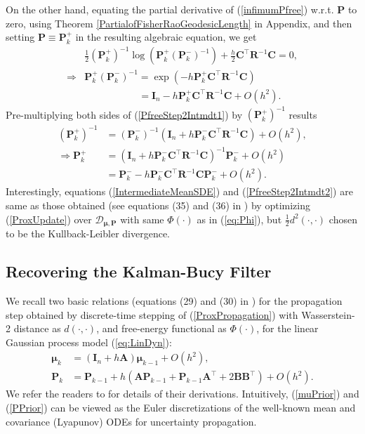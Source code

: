 \documentclass[letterpaper,10pt,twocolumn,conference]{ieeeconf}
\newcommand{\cD}{{\mathscr{D}}}
\newcommand{\bmu}{\bm{\mu}}
\newcommand{\bbP}{{\bm{P}}}
\newcommand{\bbR}{\bm{R}}
\newcommand{\bbA}{\bm{A}}
\newcommand{\bbB}{\bm{B}}
\newcommand{\bbC}{\bm{C}}
\newcommand{\bbI}{\bm{I}}
\begin{document}
On the other hand, equating the partial derivative of (\ref{infimumPfree}) w.r.t. $\bbP$ to zero, using Theorem \ref{PartialofFisherRaoGeodesicLength} in Appendix, and then setting $\bbP \equiv \bbP_{k}^{+}$ in the resulting algebraic equation, we get
\begin{align}
	&\frac{1}{2}\left(\bbP_{k}^{+}\right)^{-1}\log\left(\bbP_{k}^{+}\left(\bbP_{k}^{-}\right)^{-1}\right) + \frac{h}{2} \bbC^{\top}\bbR^{-1}\bbC = 0,\nonumber\\
\Rightarrow &\bbP_{k}^{+}\left(\bbP_{k}^{-}\right)^{-1} = \exp\left(-h\bbP_{k}^{+}\bbC^{\top}\bbR^{-1}\bbC\right) \nonumber\\
&\qquad\qquad\quad\;\: = \bbI_{n} -h\bbP_{k}^{+}\bbC^{\top}\bbR^{-1}\bbC + O(h^2).	
\label{PfreeStep2Intmdt1}
\end{align}
Pre-multiplying both sides of (\ref{PfreeStep2Intmdt1}) by $\left(\bbP_{k}^{+}\right)^{-1}$ results
\begin{align}
\left(\bbP_{k}^{+}\right)^{-1} &= \left(\bbP_{k}^{-}\right)^{-1} \left(\bbI_{n} + h\bbP_{k}^{-}\bbC^{\top}\bbR^{-1}\bbC\right) +  O(h^2),\nonumber\\
\Rightarrow \bbP_{k}^{+} &= \left(\bbI_{n} + h\bbP_{k}^{-}\bbC^{\top}\bbR^{-1}\bbC\right)^{-1}\bbP_{k}^{-} + O(h^2)\nonumber\\
& = \bbP_{k}^{-} - h\bbP_{k}^{-}\bbC^{\top}\bbR^{-1}\bbC\bbP_{k}^{-} + O(h^2).
\label{PfreeStep2Intmdt2}	
\end{align}
Interestingly, equations (\ref{IntermediateMeanSDE}) and (\ref{PfreeStep2Intmdt2}) are same as those obtained (see equations (35) and (36) in \cite{HalderGeorgiouCDC2017}) by optimizing (\ref{ProxUpdate}) over $\cD_{\bmu,\bbP}$ with same $\Phi(\cdot)$ as in (\ref{eq:Phi}), but $\frac{1}{2}d^{2}(\cdot,\cdot)$ chosen to be the Kullback-Leibler divergence.


\subsection{Recovering the Kalman-Bucy Filter}
We recall two basic relations (equations (29) and (30) in \cite{HalderGeorgiouCDC2017}) for the propagation step obtained by discrete-time stepping of (\ref{ProxPropagation}) with Wasserstein-2 distance as $d(\cdot,\cdot)$, and free-energy functional as $\Phi(\cdot)$, for the linear Gaussian process model (\ref{eq:LinDyn}):
\begin{align}
	\!\!\!\!\bmu_{k} &=\! \left(\bbI_{n} + h\bbA\right)\bmu_{k-1} + O(h^2), \label{muPrior}\\
	\!\!\!\!\bbP_{k} &= \!\bbP_{k-1} \!+ h\left(\bbA\bbP_{k-1} \!+\! \bbP_{k-1}\bbA^{\!\top}\! \!+\! 2\bbB\bbB^{\!\top}\right)\! + \!O(h^2). \label{PPrior}
\end{align}
We refer the readers to \cite[Section III.B]{HalderGeorgiouCDC2017} for details of their derivations. Intuitively, (\ref{muPrior}) and (\ref{PPrior}) can be viewed as the Euler discretizations of the well-known mean and covariance (Lyapunov) ODEs for uncertainty propagation.
\end{document}
